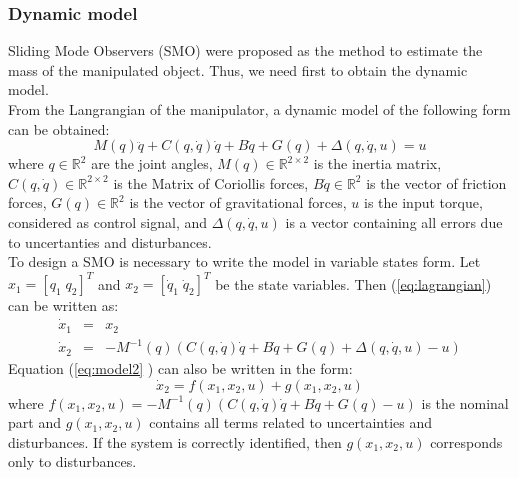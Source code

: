 \documentclass[9pt,spanish,aspectratio=1610]{beamer}
\begin{document}
\begin{frame}
\begin{columns}
\begin{column}{0.5\textwidth}
\begin{figure}
      \end{figure}
    \end{column}
  \end{columns}
\end{frame}

\begin{frame}\frametitle{Dynamic model}
  Sliding Mode Observers (SMO) were proposed as the method to estimate the mass of the manipulated object. Thus, we need first to obtain the dynamic model.\\
  From the Langrangian of the manipulator, a dynamic model of the following form can be obtained:
  \begin{equation}
    M(q)\ddot{q} + C(q, \dot{q})\dot{q} + B\dot{q} + G(q) + \Delta(q,\dot{q}, u) = u
    \label{eq:lagrangian}
  \end{equation}
  where $q\in \mathbb{R}^2$ are the joint angles, $M(q)\in \mathbb{R}^{2\times 2}$ is the inertia matrix, $C(q,\dot{q})\in \mathbb{R}^{2\times 2}$ is the Matrix of Coriollis forces, $B\dot{q}\in \mathbb{R}^2$ is the vector of friction forces, $G(q)\in\mathbb{R}^2$ is the vector of gravitational forces, $u$ is the input torque, considered as control signal, and $\Delta(q,\dot{q},u)$ is a vector containing all errors due to uncertanties and disturbances. \\
  To design a SMO is necessary to write the model in variable states form. Let $x_1 = [q_1\;q_2]^T$ and $x_2 = [\dot{q}_1\;\dot{q}_2]^T$ be the state variables. Then (\ref{eq:lagrangian}) can be written as:
  \begin{eqnarray}
    \dot{x}_1 &=& x_2\label{eq:model1}\\
    \dot{x}_2 &=& -M^{-1}(q)\left(C(q, \dot{q})\dot{q} + B\dot{q} + G(q) + \Delta(q,\dot{q},u) - u\right)\label{eq:model2}
  \end{eqnarray}
Equation (\ref{eq:model2} ) can also be written in the form:
  \begin{equation*}
    \dot{x}_2 = f(x_1, x_2, u) + g(x_1, x_2, u)
  \end{equation*}
  where $f(x_1, x_2, u) = -M^{-1}(q)\left(C(q, \dot{q})\dot{q} + B\dot{q} + G(q) - u\right)$ is the nominal part and $g(x_1, x_2, u)$ contains all terms related to uncertainties and disturbances. If the system is correctly identified, then $g(x_1, x_2, u)$ corresponds only to disturbances. 
\end{frame}
\end{document}
